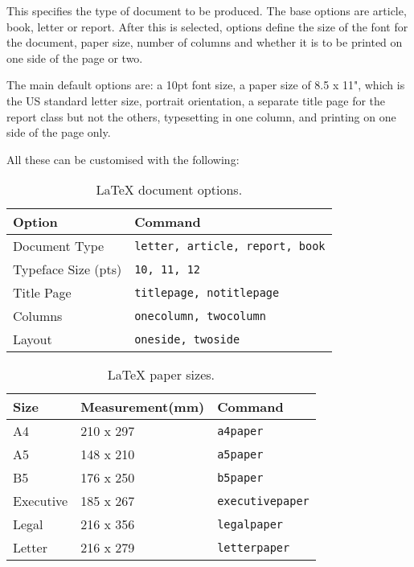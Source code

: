 \documentclass[a4paper]{article}
\begin{document}
This specifies the type of document to be produced. The base options are article, book, letter or report. After this is selected, options define the size of the font for the document, paper size, number of columns and whether it is to be printed on one side of the page or two. 

The main default options are: a 10pt font size, a paper size of 8.5 x 11", which is the US standard letter size, portrait orientation, a separate title page for the report class but not the others, typesetting in one column, and printing on one side of the page only. 

All these can be customised with the following:

\begin{table}
	\small
	\begin{center}
		\begin{tabular}{ll}
			\hline
			Option               &  Command \\
			\hline
			Document Type        &  \texttt{letter, article, report, book} \\
			Typeface Size (pts)  &  \texttt{10, 11, 12} \\
			Title Page           &  \texttt{titlepage, notitlepage} \\
			Columns              &  \texttt{onecolumn, twocolumn} \\
			Layout               &  \texttt{oneside, twoside} \\
			\hline
		\end{tabular}
		\caption{LaTeX document options.}
	\end{center}
\end{table}


\begin{table}
	\small
	\begin{center}
		\begin{tabular}{lll}
			\hline
			Size   &   Measurement(mm)   &   Command \\
			\hline
			A4         &  210 x 297  &     \texttt{a4paper}   \\
			A5         &  148 x 210  &     \texttt{a5paper}   \\
			B5         &  176 x 250  &     \texttt{b5paper}   \\
			Executive  &  185 x 267  &     \texttt{executivepaper}   \\
			Legal      &  216 x 356  &     \texttt{legalpaper}   \\
			Letter     &  216 x 279  &     \texttt{letterpaper}   \\
			
		\hline
		\end{tabular}
		\caption{LaTeX paper sizes.}
	\end{center}
\end{table}
\end{document}

